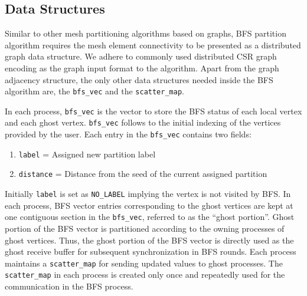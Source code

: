 \documentclass[conference]{IEEEtran}
\begin{document}
\subsection{Data Structures}
Similar to other mesh partitioning algorithms based on graphs, BFS partition algorithm requires the mesh element connectivity to be presented as a distributed graph data structure. We adhere to commonly used distributed CSR graph encoding as the graph input format to the algorithm. Apart from the graph adjacency structure, the only other data structures needed inside the BFS algorithm are, the \verb|bfs_vec| and the \verb|scatter_map|.
\par
In each process, \verb|bfs_vec| is the vector to store the BFS status of each local vertex and each ghost vertex. \verb|bfs_vec| follows to the initial indexing of the vertices provided by the user. Each entry in the \verb|bfs_vec| contains two fields: 
\begin{enumerate}
    \item \verb|label| = Assigned new partition label
    \item \verb|distance| = Distance from the seed of the current assigned partition
\end{enumerate}
\par
Initially \verb|label| is set as \verb|NO_LABEL| implying the vertex is not visited by BFS. In each process, BFS vector entries corresponding to the ghost vertices are kept at one contiguous section in the \verb|bfs_vec|, referred to as the ``ghost portion''. Ghost portion of the BFS vector is partitioned according to the owning processes of ghost vertices. Thus, the ghost portion of the BFS vector is directly used as the ghost receive buffer for subsequent synchronization in BFS rounds. Each process maintains a \verb|scatter_map| for sending updated values to ghost processes. The \verb|scatter_map| in each process is created only once and repeatedly used for the communication in the BFS process.

\end{document}
